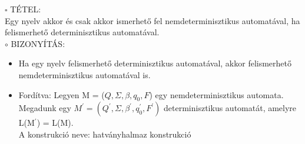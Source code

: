 \documentclass{article}
\begin{document}
    \noindent $ \square $ TÉTEL: \\
    Egy nyelv akkor és csak akkor ismerhető fel nemdeterminisztikus automatával, ha felismerhető determinisztikus automatával. \\
    \newline \indent $ \circ $ BIZONYÍTÁS:
    \begin{adjustwidth}{1cm}{}
        \begin{itemize}
            \item Ha egy nyelv felismerhető determinisztikus automatával, akkor felismerhető nemdeterminisztikus automatával is.
            \item Fordítva: Legyen M = ($ Q, \Sigma, \beta, q_0, F $) egy nemdeterminisztikus automata. Megadunk egy $ M^{'} = (Q^{'}, \Sigma, \beta^{'}, q_0^{'}, F^{'}) $ determinisztikus automatát, amelyre L(M$^{'}$) = L(M).\\
            A konstrukció neve: hatványhalmaz konstrukció
        \end{itemize}
    \end{adjustwidth}
\end{document}
